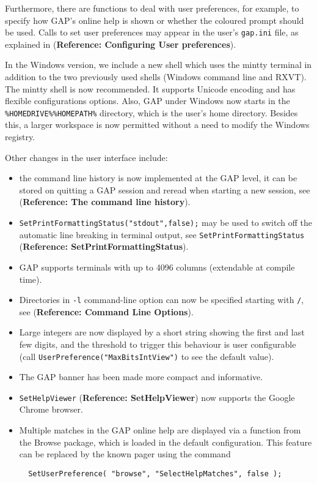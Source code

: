 \documentclass[a4paper,11pt]{report}
\begin{document}
{{{ Furthermore, there are functions to deal with user preferences, for example,
to specify how \textsf{GAP}'s online help is shown or whether the coloured prompt should be used. Calls
to set user preferences may appear in the user's \texttt{gap.ini} file, as explained in  (\textbf{Reference: Configuring User preferences}). 

 In the Windows version, we include a new shell which uses the \textsf{mintty} terminal in addition to the two previously used shells (Windows command line
and \textsf{RXVT}). The \textsf{mintty} shell is now recommended. It supports Unicode encoding and has flexible
configurations options. Also, \textsf{GAP} under Windows now starts in the \texttt{\%HOMEDRIVE\%\%HOMEPATH\%} directory, which is the user's home directory. Besides this, a larger
workspace is now permitted without a need to modify the Windows registry. 

 Other changes in the user interface include: 
\begin{itemize}
\item  the command line history is now implemented at the \textsf{GAP} level, it can be stored on quitting a \textsf{GAP} session and reread when starting a new session, see  (\textbf{Reference: The command line history}). 
\item  \texttt{SetPrintFormattingStatus("stdout",false);} may be used to switch off the automatic line breaking in terminal output, see \texttt{SetPrintFormattingStatus} (\textbf{Reference: SetPrintFormattingStatus}). 
\item  \textsf{GAP} supports terminals with up to 4096 columns (extendable at compile time). 
\item  Directories in \texttt{-l} command-line option can now be specified starting with \texttt{\texttt{}/}, see  (\textbf{Reference: Command Line Options}). 
\item  Large integers are now displayed by a short string showing the first and last
few digits, and the threshold to trigger this behaviour is user configurable
(call \texttt{UserPreference("MaxBitsIntView")} to see the default value). 
\item  The \textsf{GAP} banner has been made more compact and informative. 
\item  \texttt{SetHelpViewer} (\textbf{Reference: SetHelpViewer}) now supports the Google Chrome browser. 
\item  Multiple matches in the \textsf{GAP} online help are displayed via a function from the \textsf{Browse} package, which is loaded in the default configuration. This feature can be
replaced by the known pager using the command 
\begin{verbatim}  
  SetUserPreference( "browse", "SelectHelpMatches", false );
\end{verbatim}
 

\end{itemize}}}}
\end{document}
